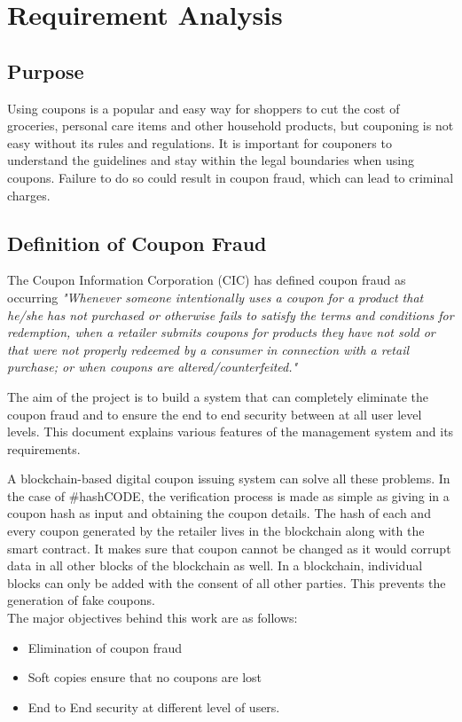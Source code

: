 \chapter{Requirement Analysis}
\section{Purpose}
\par
Using coupons is a popular and easy way for shoppers to cut the cost of
groceries, personal care items and other household products, but couponing is not easy
without its rules and regulations. It is important for couponers to understand the
guidelines and stay within the legal boundaries when using coupons. Failure to
do so could result in coupon fraud, which can lead to criminal charges.

\section{Definition of Coupon Fraud}
The Coupon Information Corporation (CIC) has defined coupon fraud as
occurring \textit{"Whenever someone intentionally uses a coupon for a product that
he/she has not purchased or otherwise fails to satisfy the terms and conditions
for redemption, when a retailer submits coupons for products they have not sold
or that were not properly redeemed by a consumer in connection with a retail
purchase; or when coupons are altered/counterfeited."}
\par
The aim of the project is to build a system that can completely eliminate
the coupon fraud and to ensure the end to end security between at all user level
levels. This document explains various features of the management system and
its requirements.
\par
A blockchain-based digital coupon issuing system can solve all these
problems. In the case of #hashCODE, the verification process is made as simple
as giving in a coupon hash as input and obtaining the coupon details. The hash of
each and every coupon generated by the retailer lives in the blockchain along with
the smart contract. It makes sure that coupon cannot be changed as it would
corrupt data in all other blocks of the blockchain as well. In a blockchain,
individual blocks can only be added with the consent of all other parties. This
prevents the generation of fake coupons.
\\
The major objectives behind this work are as follows:
\begin{itemize}
    \item Elimination of coupon fraud
    \item Soft copies ensure that no coupons are lost 
    \item End to End security at different level of users.
\end{itemize}

